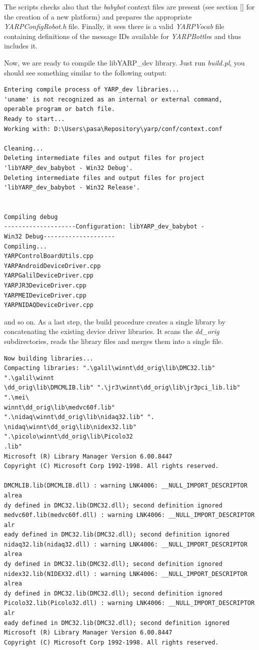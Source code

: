 The scripts checks also that the {\em babybot} context files are present (see section \ref{} for the creation of a new platform) and prepares the appropriate {\em YARPConfigRobot.h} file. Finally, it sees there is a valid {\em YARPVocab} file containing definitions of the message IDs available for {\em YARPBottle}s and thus includes it.

Now, we are ready to compile the libYARP\_dev library. Just run {\em build.pl}, you should see something similar to the following output:

\begin{verbatim}
Entering compile process of YARP_dev libraries...
'uname' is not recognized as an internal or external command,
operable program or batch file.
Ready to start...
Working with: D:\Users\pasa\Repository\yarp/conf/context.conf

Cleaning...
Deleting intermediate files and output files for project 
'libYARP_dev_babybot - Win32 Debug'.
Deleting intermediate files and output files for project 
'libYARP_dev_babybot - Win32 Release'.


Compiling debug
--------------------Configuration: libYARP_dev_babybot - 
Win32 Debug--------------------
Compiling...
YARPControlBoardUtils.cpp
YARPAndroidDeviceDriver.cpp
YARPGalilDeviceDriver.cpp
YARPJR3DeviceDriver.cpp
YARPMEIDeviceDriver.cpp
YARPNIDAQDeviceDriver.cpp
\end{verbatim}

\noindent and so on. As a last step, the build procedure creates a single library by concatenating the existing device driver libraries. It scans the {\em dd\_orig} subdirectories, reads the library files and merges them into a single file.

\begin{verbatim}
Now building libraries...
Compacting libraries: ".\galil\winnt\dd_orig\lib\DMC32.lib" ".\galil\winnt
\dd_orig\lib\DMCMLIB.lib" ".\jr3\winnt\dd_orig\lib\jr3pci_lib.lib" ".\mei\
winnt\dd_orig\lib\medvc60f.lib" ".\nidaq\winnt\dd_orig\lib\nidaq32.lib" ".
\nidaq\winnt\dd_orig\lib\nidex32.lib" ".\picolo\winnt\dd_orig\lib\Picolo32
.lib"
Microsoft (R) Library Manager Version 6.00.8447
Copyright (C) Microsoft Corp 1992-1998. All rights reserved.

DMCMLIB.lib(DMCMLIB.dll) : warning LNK4006: __NULL_IMPORT_DESCRIPTOR alrea
dy defined in DMC32.lib(DMC32.dll); second definition ignored
medvc60f.lib(medvc60f.dll) : warning LNK4006: __NULL_IMPORT_DESCRIPTOR alr
eady defined in DMC32.lib(DMC32.dll); second definition ignored
nidaq32.lib(nidaq32.dll) : warning LNK4006: __NULL_IMPORT_DESCRIPTOR alrea
dy defined in DMC32.lib(DMC32.dll); second definition ignored
nidex32.lib(NIDEX32.dll) : warning LNK4006: __NULL_IMPORT_DESCRIPTOR alrea
dy defined in DMC32.lib(DMC32.dll); second definition ignored
Picolo32.lib(Picolo32.dll) : warning LNK4006: __NULL_IMPORT_DESCRIPTOR alr
eady defined in DMC32.lib(DMC32.dll); second definition ignored
Microsoft (R) Library Manager Version 6.00.8447
Copyright (C) Microsoft Corp 1992-1998. All rights reserved.
\end{verbatim}


